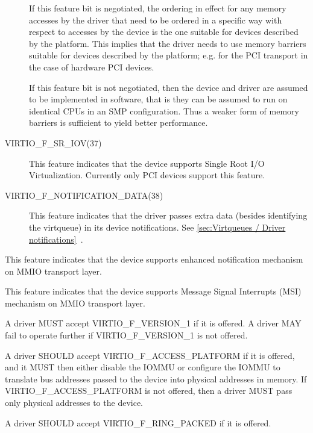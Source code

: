 \begin{description}
  If this feature bit is negotiated, the ordering in effect for any
  memory accesses by the driver that need to be ordered in a specific way
  with respect to accesses by the device is the one suitable for devices
  described by the platform. This implies that the driver needs to use
  memory barriers suitable for devices described by the platform; e.g.
  for the PCI transport in the case of hardware PCI devices.

  If this feature bit is not negotiated, then the device
  and driver are assumed to be implemented in software, that is
  they can be assumed to run on identical CPUs
  in an SMP configuration.
  Thus a weaker form of memory barriers is sufficient
  to yield better performance.
  \item[VIRTIO_F_SR_IOV(37)] This feature indicates that
  the device supports Single Root I/O Virtualization.
  Currently only PCI devices support this feature.
  \item[VIRTIO_F_NOTIFICATION_DATA(38)] This feature indicates
  that the driver passes extra data (besides identifying the virtqueue)
  in its device notifications.
  See \ref{sec:Virtqueues / Driver notifications}~.
\end{description}
  \item[VIRTIO_F_MMIO_NOTIFICATION(39)] This feature indicates
  that the device supports enhanced notification mechanism on
  MMIO transport layer.
  \item[VIRTIO_F_MMIO_MSI(40)] This feature indicates that the
  device supports Message Signal Interrupts (MSI) mechanism on
  MMIO transport layer.


A driver MUST accept VIRTIO_F_VERSION_1 if it is offered.  A driver
MAY fail to operate further if VIRTIO_F_VERSION_1 is not offered.

A driver SHOULD accept VIRTIO_F_ACCESS_PLATFORM if it is offered, and it MUST
then either disable the IOMMU or configure the IOMMU to translate bus addresses
passed to the device into physical addresses in memory.  If
VIRTIO_F_ACCESS_PLATFORM is not offered, then a driver MUST pass only physical
addresses to the device.

A driver SHOULD accept VIRTIO_F_RING_PACKED if it is offered.

